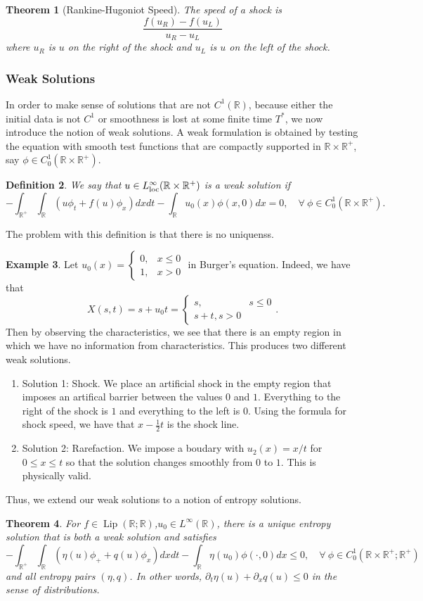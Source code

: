 \documentclass{article}
\newtheorem{theorem}{Theorem}[subsection] %
\newtheorem{definition}[theorem]{Definition}
\theoremstyle{definition}
\newtheorem{example}[theorem]{Example}
\theoremstyle{definition}
\newcommand{\R}{\mathbb{R}}
\begin{document}
\begin{theorem}[Rankine-Hugoniot Speed]
    The speed of a shock is
    $$\frac{f(u_R)-f(u_L)}{u_R-u_L}$$
    where $u_R$ is $u$ on the right of the shock and $u_L$ is $u$ on the left of the shock.
\end{theorem}
\subsubsection{Weak Solutions}
In order to make sense of solutions that are not $C^1(\R)$, because either the initial data is not $C^1$ or smoothness is lost at some finite time $T^*$, we now introduce the notion of weak solutions. A weak formulation is obtained by testing the equation with smooth test functions that are compactly supported in $\R\times \R^+$, say $\phi \in C^{1}_0(\R\times \R^+)$.
\begin{definition}
    We say that $u\in L^{\infty}_{\rm loc}(\R\times \R^+)$ is a weak solution if
    $$-\int_{\R^+}\int_{\R}(u\phi_t+f(u)\phi_x)dxdt-\int_{\R}u_0(x)\phi(x,0)dx=0,\quad \forall\:\phi\in C^1_0(\R\times \R^+).$$
\end{definition}
The problem with this definition is that there is no uniquenss.
\begin{example}
    Let $u_0(x)=\begin{cases}
        0,&x\leq 0 \\
        1,&x>0
    \end{cases}$ in Burger's equation. Indeed, we have that
    $$X(s,t)=s+u_0t=\begin{cases}
        s,&s\leq 0 \\
        s+t,s>0
    \end{cases}.$$
    Then by observing the characteristics, we see that there is an empty region in which we have no information from characteristics. This produces two different weak solutions.
    \begin{enumerate}
        \item Solution 1: Shock. We place an artificial shock in the empty region that imposes an artifical barrier between the values $0$ and $1$. Everything to the right of the shock is $1$ and everything to the left is $0$. Using the formula for shock speed, we have that $x-\frac{1}{2}t$ is the shock line.
        \item Solution 2: Rarefaction. We impose a boudary with $u_2(x)=x/t$ for $0\leq x\leq t$ so that the solution changes smoothly from $0$ to $1$. This is physically valid.
    \end{enumerate}
\end{example}
Thus, we extend our weak solutions to a notion of entropy solutions.
\begin{theorem}
    For $f\in \operatorname{Lip}(\R;\R)$,$u_0\in L^{\infty}(\R)$, there is a unique entropy solution that is both a weak solution and satisfies
    $$-\int_{\R^+}\int_{\R}(\eta(u)\phi_++q(u)\phi_{x})dxdt-\int_{\R}\eta(u_0)\phi(\cdot,0)dx\leq 0,\quad \forall\:\phi\in C_0^1(\R\times \R^+;\R^+)$$
    and all entropy pairs $(\eta,q)$. In other words, $\partial_{t}\eta(u)+\partial_{x}q(u)\leq 0$ in the sense of distributions.
\end{theorem}
\end{document}
